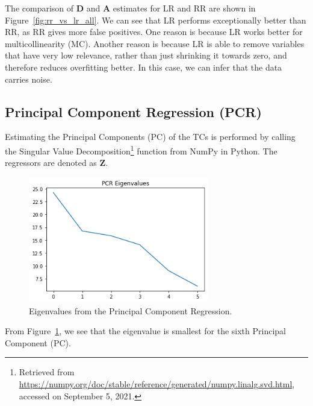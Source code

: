 \documentclass[11pt]{article}
\def\*#1{\mathbf{#1}}
\begin{document}
The comparison of $\*D$ and $\*A$ estimates for LR and RR are shown in Figure~\ref{fig:rr_vs_lr_all}. We can see that LR performs exceptionally better than RR, as RR gives more false positives. One reason is because LR works better for multicollinearity (MC). Another reason is because LR is able to remove variables that have very low relevance, rather than just shrinking it towards zero, and therefore reduces overfitting better. In this case, we can infer that the data carries noise.

\subsection{Principal Component Regression (PCR)}

Estimating the Principal Components (PC) of the TCs is performed by calling the Singular Value Decomposition\footnote{Retrieved from \href{https://numpy.org/doc/stable/reference/generated/numpy.linalg.svd.html}{https://numpy.org/doc/stable/reference/generated/numpy.linalg.svd.html}, accessed on September 5, 2021.} function from NumPy in Python. The regressors are denoted as $\*Z$.

    \begin{figure}[H]
        \begin{center}
            \includegraphics[width=0.7\textwidth]{../plots/2_5_eigenvalues_min}
        \caption{Eigenvalues from the Principal Component Regression.}
        \label{fig:pcr_eigenvals}
        \end{center}
    \end{figure}

From Figure~\ref{fig:pcr_eigenvals}, we see that the eigenvalue is smallest for the sixth Principal Component (PC). 
\end{document}
